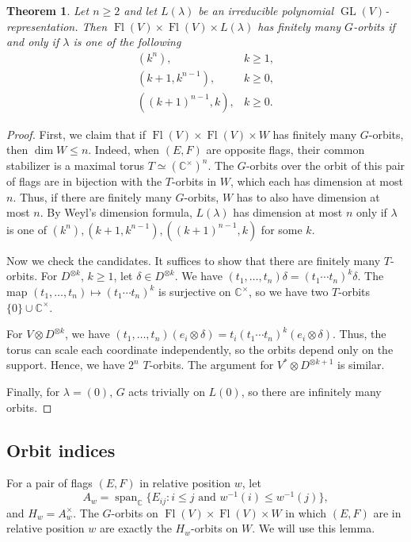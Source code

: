 \documentclass[12pt,a4paper]{article}
\def\Fl{\operatorname{Fl}}
\def\GL{\operatorname{GL}}
\def\FlVV{\Fl(V) \times \Fl(V)}
\theoremstyle{plain}
\newtheorem{thm}{Theorem}[section]
\theoremstyle{definition}
\theoremstyle{remark}
\newcommand{\CC}{\mathbb{C}}
\begin{document}
    \begin{thm}\label{thm:classify}
        Let $n\geq 2$ and let $L(\lambda)$ be an irreducible polynomial $\GL(V)$-representation. Then $\FlVV\times L(\lambda)$ has finitely many $G$-orbits if and only if $\lambda$ is one of the following
        \[
        \begin{array}{ll}
        (k^n),& k\geq1,\\
        (k+1,k^{n-1}),& k\geq0,\\
        ((k+1)^{n-1},k),& k\geq0.
        \end{array}
        \]
    \end{thm}

    \begin{proof}
        First, we claim that if $\FlVV\times W$ has finitely many $G$-orbits, then $\dim W\leq n$. Indeed, when $(E,F)$ are opposite flags, their common stabilizer is a maximal torus $T\simeq (\CC^\times)^n$. The $G$-orbits over the orbit of this pair of flags are in bijection with the $T$-orbits in $W$, which each has dimension at most $n$. Thus, if there are finitely many $G$-orbits, $W$ has to also have dimension at most $n$. By Weyl's dimension formula, $L(\lambda)$ has dimension at most $n$ only if $\lambda$ is one of $(k^n), (k+1,k^{n-1}), ((k+1)^{n-1},k)$ for some $k$.

        Now we check the candidates. It suffices to show that there are finitely many $T$-orbits. For $D^{\otimes k}$, $k\geq 1$, let $\delta \in D^{\otimes k}$. We have $(t_1,\ldots,t_n) \delta = ( t_1\cdots t_n)^k\delta$. The map $(t_1,\ldots,t_n)\mapsto(t_1\cdots t_n)^k$ is surjective on $\CC^\times$, so we have two $T$-orbits $\{0\} \cup \CC^\times$.

        For $V\otimes D^{\otimes k}$, we have $(t_1,\ldots,t_n) (e_i\otimes\delta) = t_i( t_1\cdots t_n)^k (e_i\otimes\delta)$. Thus, the torus can scale each coordinate independently, so the orbits depend only on the support. Hence, we have $2^n$ $T$-orbits. The argument for $V^*\otimes D^{\otimes k+1}$ is similar.

        Finally, for $\lambda = (0)$, $G$ acts trivially on $L(0)$, so there are infinitely many orbits.
    \end{proof}

\subsection{Orbit indices}

    For a pair of flags $(E,F)$ in relative position $w$, let
    \[
    A_w=\operatorname{span}_{\CC}\{E_{ij}:i\leq j \text{ and } w^{-1}(i)\leq w^{-1}(j)\},
    \]
    and $H_w = A_w^\times$. The $G$-orbits on $\FlVV\times W$ in which $(E,F)$ are in relative position $w$ are exactly the $H_w$-orbits on $W$. We will use this lemma.
\end{document}
